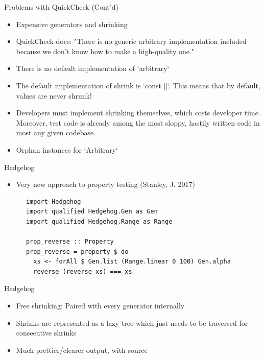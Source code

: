   \begin{frame}{Problems with QuickCheck (Cont'd)}
      \begin{itemize}
          \item Expensive generators and shrinking
          \item QuickCheck docs: "There is no generic arbitrary implementation included because we don't know how to make a high-quality one."
          \item There is no default implementation of `arbitrary`
          \item The default implementation of shrink is `const []`. This means that by default, values are never shrunk!
          \item Developers must implement shrinking themselves, which costs developer time. Moreover, test code is already among the most sloppy, hastily written
          code in most any given codebase.
          \item Orphan instances for `Arbitrary`
      \end{itemize}
  \end{frame}
  
  \begin{frame}[fragile]{Hedgehog}
      \begin{itemize}
          \item Very new approach to property testing (Stanley, J. 2017)
      \end{itemize}
      
      \begin{verbatim}
      import Hedgehog
      import qualified Hedgehog.Gen as Gen
      import qualified Hedgehog.Range as Range
      
      prop_reverse :: Property
      prop_reverse = property $ do
        xs <- forAll $ Gen.list (Range.linear 0 100) Gen.alpha
        reverse (reverse xs) === xs
      \end{verbatim}
  \end{frame}
  
  \begin{frame}[fragile]{Hedgehog}
      \begin{itemize}
          \item Free shrinking: Paired with every generator internally
          \item Shrinks are represented as a lazy tree which just needs to be traversed for consecutive shrinks
          \item Much prettier/clearer output, with source
      \end{itemize}
  \end{frame}
  
